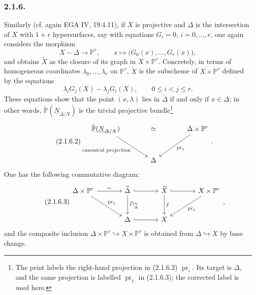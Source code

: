 \subsubsection*{2.1.6.}
Similarly (cf. again EGA IV, 19.4.11), if $X$ is projective and $\Delta$ is
the intersection of $X$ with $1+r$ hypersurfaces, say with equations
$G_i=0$, $i=0,\ldots,r$, one again considers the morphism
\[
X-\Delta\longrightarrow\mathbb P^r,\qquad
x\longmapsto\bigl(G_0(x),\ldots,G_r(x)\bigr),
\]
and obtains $\widetilde X$ as the closure of its graph in
$X\times\mathbb P^r$. Concretely, in terms of homogeneous coordinates
$\lambda_0,\ldots,\lambda_r$ on $\mathbb P^r$, $\widetilde X$ is the
subscheme of $X\times\mathbb P^r$ defined by the equations
\begin{equation}\tag{2.1.6.1}
\lambda_iG_j(X)-\lambda_jG_i(X),
\qquad 0\leq i<j\leq r.
\end{equation}
These equations show that the point $(x,\lambda)$ lies in
$\widetilde\Delta$ if and only if $x\in\Delta$; in other words,
$\check{\mathbb P}(\underline N_{\Delta/X})$ is the trivial projective
bundle\footnote{The print labels the right-hand projection in (2.1.6.2)
$\operatorname{pr}_i$. Its target is $\Delta$, and the same projection is
labelled $\operatorname{pr}_1$ in (2.1.6.3); the corrected label is used
here.}
\begin{equation}\tag{2.1.6.2}
\begin{tikzcd}[column sep=large,row sep=large]
\check{\mathbb P}(\underline N_{\Delta/X})
  \arrow[rr,phantom,"\simeq"]
  \arrow[dr,"\text{canonical projection}"']
  & {} &
\Delta\times\mathbb P^r
  \arrow[dl,"\operatorname{pr}_1"]\\
{} & \Delta & {}
\end{tikzcd}.
\end{equation}
One has the following commutative diagram:
\begin{equation}\tag{2.1.6.3}
\begin{tikzcd}[column sep=large,row sep=large]
\Delta\times\mathbb P^r
  \arrow[r,"\sim"]
  \arrow[dr,"\operatorname{pr}_1"]
&
\widetilde\Delta
  \arrow[r,hook]
  \arrow[d,"f|_{\widetilde\Delta}"]
&
\widetilde X
  \arrow[r,hook]
  \arrow[d,"f"]
&
X\times\mathbb P^r
  \arrow[dl,"\operatorname{pr}_1"]
\\
{} & \Delta \arrow[r,hook] & X & {}
\end{tikzcd},
\end{equation}
and the composite inclusion
$\Delta\times\mathbb P^r\hookrightarrow X\times\mathbb P^r$ is obtained
from $\Delta\hookrightarrow X$ by base change.
